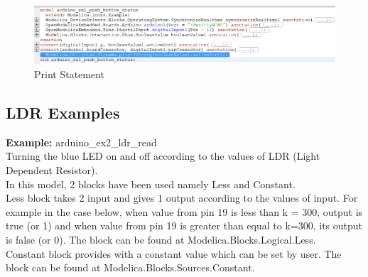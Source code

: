 \documentclass[12pt,a4paper]{report}
\begin{document}
\begin{figure}[H]
\centering
\includegraphics[width =\textwidth]{pb_ex1_print}
\caption{Print Statement}
\label{figure:23}
\end{figure}


\subsection{LDR Examples}
\textbf{Example:} arduino\_ex2\_ldr\_read\\

Turning the blue LED on and off according to the values of LDR (Light Dependent Resistor).\\

In this model, 2 blocks have been used namely Less and Constant.\\

Less block takes 2 input and gives 1 output according to the values of input. For example in the case below, when value from pin 19 is less than k = 300, output is true (or 1) and when value from pin 19 is greater than equal to k=300, its output is false (or 0). The block can be found at Modelica.Blocks.Logical.Less.\\

Constant block provides with a constant value which can be set by user. The block can be found at Modelica.Blocks.Sources.Constant.
\end{document}
